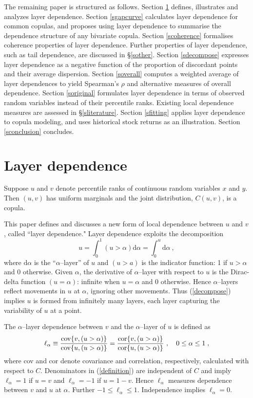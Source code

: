 \documentclass[authoryear]{elsarticle}
\newcommand{\cov}{{\rm cov}}
\newcommand{\cor}{\mathrm{cor}}
\newcommand{\de}{\mathrm{d}}
\newcommand{\cq}{\ ,\quad }
\newcommand{\eref}[1]{(\ref{#1})}
\newcommand{\sref}[1]{\S\ref{#1}}
\newcommand{\aref}[1]{\ref{#1}}
\begin{document}
The remaining paper is structured as follows. Section \aref{sintroduction} defines, illustrates and analyzes layer dependence. Section \aref{sgapcurve} calculates layer dependence for common copulas, and proposes using layer dependence to summarise the dependence structure of any bivariate copula. Section \aref{scoherence} formalises coherence properties of layer dependence. Further properties of layer dependence, such as tail dependence, are discussed in \sref{sother}. Section \aref{sdecompose} expresses layer dependence as a negative function of the proportion of discordant points and their average dispersion. Section \aref{soverall} computes a weighted average of layer dependences to yield Spearman's $\rho$ and alternative measures of overall dependence. Section \aref{soriginal} formulates layer dependence in terms of observed random variables instead of their percentile ranks. Existing local dependence measures are assessed in \sref{sliterature}. Section \aref{sfitting} applies layer dependence to copula modeling, and uses historical stock returns as an illustration. Section \aref{sconclusion} concludes.



\section{Layer dependence}\label{sintroduction}

Suppose $u$ and $v$ denote percentile ranks of continuous random variables $x$ and $y$.  Then $(u,v)$ has uniform marginals and the joint distribution, $C(u,v)$, is a copula.

This paper defines and discusses a new form of local dependence between $u$ and $v$, called ``layer dependence." Layer dependence exploits the decomposition
\begin{equation}\label{decompose}
u=\int_0^1 (u>\alpha) \de \alpha =  \int_0^u \de \alpha \ ,
\end{equation}
where $\de \alpha$ is the ``$\alpha$--layer'' of $u$ and $(u>a)$ is the indicator function:  1 if $u>\alpha$ and $0$ otherwise. Given $\alpha$, the derivative of $\alpha$--layer with respect to $u$ is the Dirac-delta function $(u=\alpha)$: infinite when $u=\alpha$ and $0$ otherwise. Hence $\alpha$--layers reflect movements in $u$ at $\alpha$, ignoring other movements. Thus \eref{decompose} implies $u$ is formed from infinitely many layers, each layer capturing the variability of $u$ at a point.

The $\alpha$--layer dependence  between $v$ and the $\alpha$--layer of $u$ is defined as
\begin{equation}\label{definition}
\ell_\alpha \equiv \frac{\cov\{v,(u>\alpha)\}}{\cov\{u,(u>\alpha)\}}
=\frac{\cor\{v,(u>\alpha)\}}{\cor\{u,(u>\alpha)\}} \cq 0\leq\alpha\leq 1\;,
\end{equation}
where cov and cor denote covariance and correlation, respectively, calculated with respect to $C$. Denominators in \eref{definition} are  independent of $C$ and imply $\ell_\alpha=1$ if $u=v$ and $\ell_\alpha=-1$ if $u=1-v$. Hence $\ell_\alpha$ measures dependence between $v$ and $u$ at $\alpha$. Further   $-1\le\ell_\alpha\le 1$. Independence implies $\ell_\alpha=0$.
\end{document}
